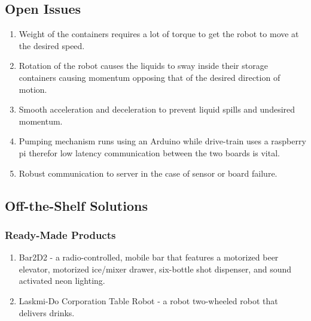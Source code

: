 \documentclass [11pt]{article}
\begin{document}
\subsection{Open Issues}
	\begin{enumerate}[label=\textbf{(\roman*)}]
		\item Weight of the containers requires a lot of torque to get the robot to move at the desired speed.
		\item Rotation of the robot causes the liquids to sway inside their storage containers causing momentum opposing that of the desired direction of motion.
		\item Smooth acceleration and deceleration to prevent liquid spills and undesired momentum.
		\item Pumping mechanism runs using an Arduino while drive-train uses a raspberry pi therefor low latency communication between the two boards is vital.
		\item Robust communication to server in the case of sensor or board failure.	
	\end{enumerate}

\subsection{Off-the-Shelf Solutions}

\subsubsection{Ready-Made Products}
	\begin{enumerate}[label=\textbf{(\roman*)}]
		\item Bar2D2 - a radio-controlled, mobile bar that features a motorized beer elevator, motorized ice/mixer drawer, six-bottle shot dispenser, and sound activated neon lighting. 
		\item Laskmi-Do Corporation Table Robot - a robot two-wheeled robot that delivers drinks.
	\end{enumerate}
	
\end{document}
